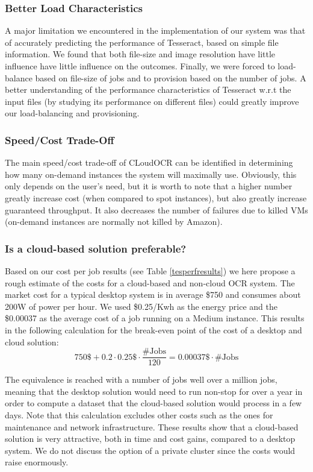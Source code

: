 \documentclass[a4paper]{IEEEtran}
\begin{document}
\subsubsection*{Better Load Characteristics}

A major limitation we encountered in the implementation of our system was that of accurately predicting the performance of Tesseract, based on simple file information. We found that both file-size and image resolution have little influence have little influence on the outcomes. Finally, we were forced to load-balance based on file-size of jobs and to provision based on the number of jobs. A better understanding of the performance characteristics of Tesseract w.r.t the input files (by studying its performance on different files) could greatly improve our load-balancing and provisioning.

\subsubsection*{Speed/Cost Trade-Off}

The main speed/cost trade-off of CLoudOCR can be identified in determining how many on-demand instances the system will maximally use. Obviously, this only depends on the user's need, but it is worth to note that a higher number greatly increase cost (when compared to spot instances), but also greatly increase guaranteed throughput. It also decreases the number of failures due to killed VMs (on-demand instances are normally not killed by Amazon).

\subsubsection*{Is a cloud-based solution preferable?}

Based on our cost per job results (see Table \ref{tesperfresults}) we here propose a rough estimate of the costs for  a cloud-based and non-cloud OCR system. The market cost for a typical desktop system is in average \$750 and consumes about 200W of power per hour. We used \$0.25/Kwh as the energy price and the \$0.00037 as the average cost of a job running on a Medium instance. This results in the following calculation for the break-even point of the cost of a desktop and cloud solution:
$$
750\$ + 0.2 \cdot 0.25\$ \cdot \frac{\text{\#Jobs}}{120} = 0.00037\$ \cdot \text{\#Jobs}
$$

The equivalence is reached with a number of jobs well over a million jobs, meaning that the desktop solution would need to run non-stop for over a year in order to compute a dataset that the cloud-based solution would process in a few days. Note that this calculation excludes other costs such as the ones for maintenance and network infrastructure. These results show that a cloud-based solution is very attractive, both in time and cost gains, compared to a desktop system. We do not discuss the option of a private cluster since the costs would raise enormously.
	
\end{document}
